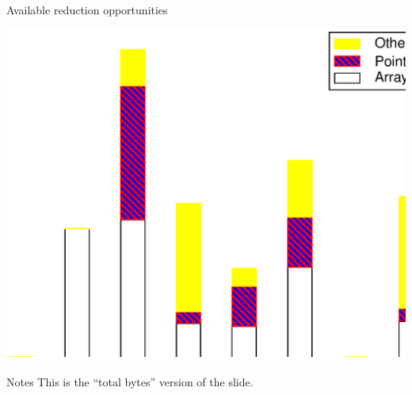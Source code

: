 \documentclass[%
pdf,
colorBG,
slideColor,
nototal,
oqe
]{prosper}
\newenvironment{talknotes}{\begin{slide}{Notes}\tiny}{\end{slide}}
\begin{document}
\begin{slide}{Available reduction opportunities}
\begin{center}
\includegraphics[scale=0.45]{Figures/spec-space-2.eps}
\end{center}
\end{slide}

\begin{talknotes}
This is the ``total bytes'' version of the slide.
\end{talknotes}
\end{document}
